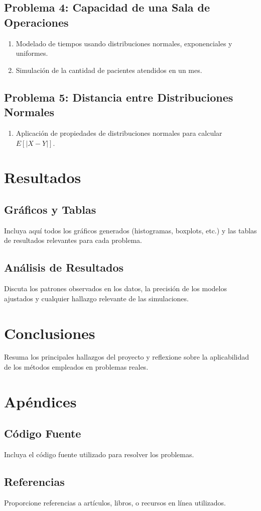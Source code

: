 \documentclass[12pt]{article}
\begin{document}
\subsection{Problema 4: Capacidad de una Sala de Operaciones}
\begin{enumerate}
    \item Modelado de tiempos usando distribuciones normales, exponenciales y uniformes.
    \item Simulación de la cantidad de pacientes atendidos en un mes.
\end{enumerate}

\subsection{Problema 5: Distancia entre Distribuciones Normales}
\begin{enumerate}
    \item Aplicación de propiedades de distribuciones normales para calcular $E[|X - Y|]$.
\end{enumerate}

\newpage

\section{Resultados}
\subsection{Gráficos y Tablas}
Incluya aquí todos los gráficos generados (histogramas, boxplots, etc.) y las tablas de resultados relevantes para cada problema.

\subsection{Análisis de Resultados}
Discuta los patrones observados en los datos, la precisión de los modelos ajustados y cualquier hallazgo relevante de las simulaciones.

\section{Conclusiones}
Resuma los principales hallazgos del proyecto y reflexione sobre la aplicabilidad de los métodos empleados en problemas reales.

\section{Apéndices}
\subsection{Código Fuente}
Incluya el código fuente utilizado para resolver los problemas.

\subsection{Referencias}
Proporcione referencias a artículos, libros, o recursos en línea utilizados.
\end{document}
